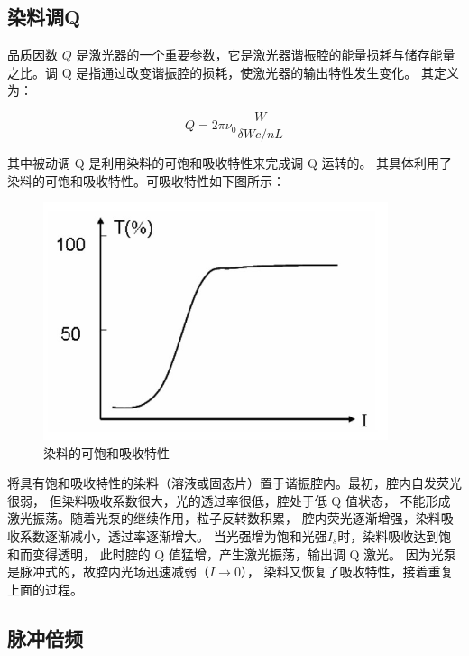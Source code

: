 \documentclass[a4paper,UTF8]{ctexart}
\begin{document}
\subsection{染料调Q}

品质因数 $Q$ 是激光器的一个重要参数，它是激光器谐振腔的能量损耗与储存能量之比。调 Q 是指通过改变谐振腔的损耗，使激光器的输出特性发生变化。
其定义为：

\begin{equation}
    Q = 2\pi \nu_0 \frac{W}{\delta W c/nL}
\end{equation}

其中被动调 Q 是利用染料的可饱和吸收特性来完成调 Q 运转的。
其具体利用了染料的可饱和吸收特性。可吸收特性如下图所示：

\begin{figure}[H]
    \centering
    \begin{minipage}[b]{0.9\textwidth}
        \centering
        \includegraphics[width=0.9\textwidth]{./fig4.jpg}
        \caption{染料的可饱和吸收特性}
    \end{minipage}
\end{figure}

将具有饱和吸收特性的染料（溶液或固态片）置于谐振腔内。最初，腔内自发荧光很弱，
但染料吸收系数很大，光的透过率很低，腔处于低 Q 值状态，
不能形成激光振荡。随着光泵的继续作用，粒子反转数积累，
腔内荧光逐渐增强，染料吸收系数逐渐减小，透过率逐渐增大。
当光强增为饱和光强$I_s$时，染料吸收达到饱和而变得透明，
此时腔的 Q 值猛增，产生激光振荡，输出调 Q 激光。
因为光泵是脉冲式的，故腔内光场迅速减弱（$I\rightarrow 0$），
染料又恢复了吸收特性，接着重复上面的过程。

\subsection{脉冲倍频}
\end{document}
